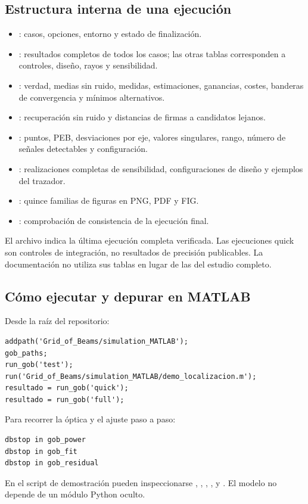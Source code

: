 \subsection{Estructura interna de una ejecución}
\begin{itemize}
\item {}: casos, opciones, entorno y estado de finalización.
\item {}: resultados completos de todos los casos; las otras tablas corresponden a controles, diseño, rayos y sensibilidad.
\item {}: verdad, medias sin ruido, medidas, estimaciones, ganancias, costes, banderas de convergencia y mínimos alternativos.
\item {}: recuperación sin ruido y distancias de firmas a candidatos lejanos.
\item {}: puntos, PEB, desviaciones por eje, valores singulares, rango, número de señales detectables y configuración.
\item {}: realizaciones completas de sensibilidad, configuraciones de diseño y ejemplos del trazador.
\item {}: quince familias de figuras en PNG, PDF y FIG.
\item {}: comprobación de consistencia de la ejecución final.
\end{itemize}
El archivo  indica la última ejecución completa verificada. Las ejecuciones quick son controles de integración, no resultados de precisión publicables. La documentación no utiliza sus tablas en lugar de las del estudio completo.

\subsection{Cómo ejecutar y depurar en MATLAB}
Desde la raíz del repositorio:
\begin{lstlisting}
addpath('Grid_of_Beams/simulation_MATLAB');
gob_paths;
run_gob('test');
run('Grid_of_Beams/simulation_MATLAB/demo_localizacion.m');
resultado = run_gob('quick');
resultado = run_gob('full');
\end{lstlisting}
Para recorrer la óptica y el ajuste paso a paso:
\begin{lstlisting}
dbstop in gob_power
dbstop in gob_fit
dbstop in gob_residual
\end{lstlisting}
En el script de demostración pueden inspeccionarse , , , ,  y . El modelo no depende de un módulo Python oculto.


